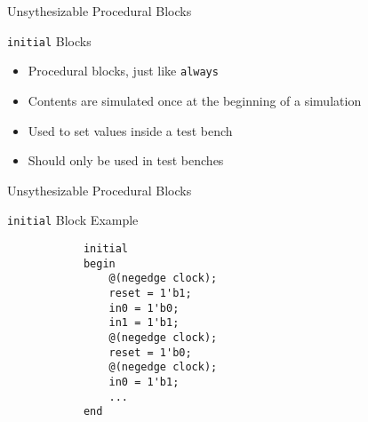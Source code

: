 \documentclass[table,dvipsnames,colorlinks=true]{beamer}
\begin{document}
\begin{frame}{Unsythesizable Procedural Blocks}
    \begin{block}{\texttt{initial} Blocks}
        \begin{itemize}
            \item Procedural blocks, just like \texttt{always}
            \item Contents are simulated once at the beginning of a simulation
            \item Used to set values inside a test bench
            \item Should only be used in test benches
        \end{itemize}
    \end{block}
\end{frame}

\begin{frame}[fragile]{Unsythesizable Procedural Blocks}
    \begin{block}{\texttt{initial} Block Example}
        \begin{verbatim}
            initial
            begin
                @(negedge clock);
                reset = 1'b1;
                in0 = 1'b0; 
                in1 = 1'b1;
                @(negedge clock);
                reset = 1'b0;
                @(negedge clock);
                in0 = 1'b1;
                ...
            end
        \end{verbatim}
    \end{block}
\end{frame}
\end{document}
